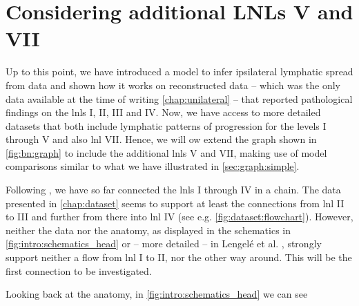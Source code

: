 \documentclass[\relativeRoot/main.tex]{subfiles}
\begin{document}
\section{Considering additional LNLs V and VII}
\label{sec:graph:all_lnls}



Up to this point, we have introduced a model to infer ipsilateral lymphatic spread from data and shown how it works on reconstructed data -- which was the only data available at the time of writing \cref{chap:unilateral} -- that reported pathological findings on the \glspl{lnl} I, II, III and IV. Now, we have access to more detailed datasets that both include lymphatic patterns of progression for the levels I through V and also \gls{lnl} VII. Hence, we will ow extend the graph shown in \cref{fig:bn:graph} to include the additional \glspl{lnl} V and VII, making use of model comparisons similar to what we have illustrated in \cref{sec:graph:simple}.

Following \cite{pouymayou_bayesian_2019}, we have so far connected the \glspl{lnl} I through IV in a chain. The data presented in \cref{chap:dataset} seems to support at least the connections from \gls{lnl} II to III and further from there into \gls{lnl} IV (see e.g. \cref{fig:dataset:flowchart}). However, neither the data nor the anatomy, as displayed in the schematics in \cref{fig:intro:schematics_head} or -- more detailed -- in Lengelé et al. \cite{lengele_anatomical_2007}, strongly support neither a flow from \gls{lnl} I to II, nor the other way around. This will be the first connection to be investigated.

Looking back at the anatomy, in \cref{fig:intro:schematics_head} we can see
\end{document}
